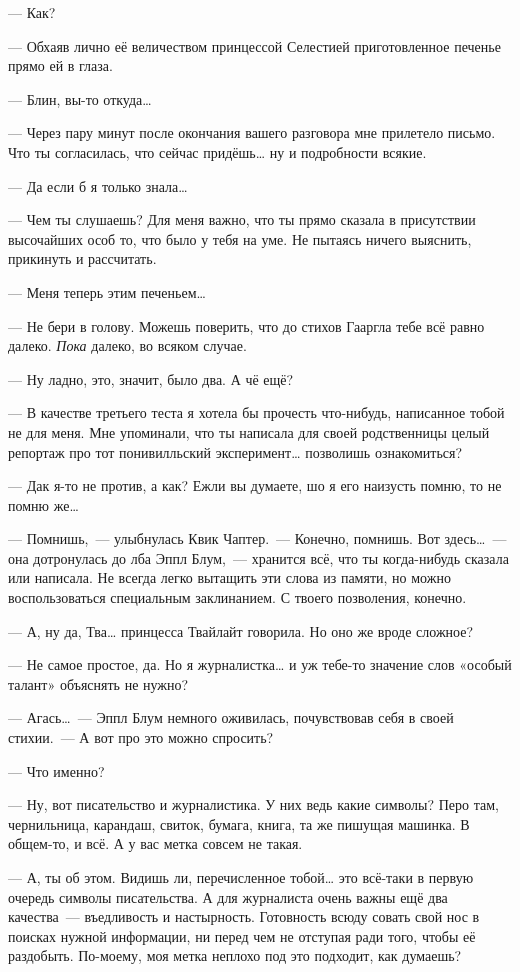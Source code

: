 \documentclass[fontsize=11pt,a5paper,titlepage=firstcover]{scrbook}
\begin{document}
--- Как?

--- Обхаяв лично её величеством принцессой Селестией приготовленное печенье прямо ей в глаза.

--- Блин, вы-то откуда{\ldots}

--- Через пару минут после окончания вашего разговора мне прилетело письмо. Что ты согласилась, что сейчас придёшь{\ldots} ну и подробности всякие.

--- Да если б я только знала{\ldots}

--- Чем ты слушаешь? Для меня важно, что ты прямо сказала в присутствии высочайших особ то, что было у тебя на уме. Не пытаясь ничего выяснить, прикинуть и рассчитать.

--- Меня теперь этим печеньем{\ldots}

--- Не бери в голову. Можешь поверить, что до стихов Гааргла тебе всё равно далеко. \emph{Пока} далеко, во всяком случае.

--- Ну ладно, это, значит, было два. А чё ещё?

--- В качестве третьего теста я хотела бы прочесть что-нибудь, написанное тобой не для меня. Мне упоминали, что ты написала для своей родственницы целый репортаж про тот понивилльский эксперимент{\ldots} позволишь ознакомиться?

--- Дак я-то не против, а как? Ежли вы думаете, шо я его наизусть помню, то не помню же{\ldots}

--- Помнишь,~--- улыбнулась Квик Чаптер.~--- Конечно, помнишь. Вот здесь{\ldots}~--- она дотронулась до лба Эппл Блум,~--- хранится всё, что ты когда-нибудь сказала или написала. Не всегда легко вытащить эти слова из памяти, но можно воспользоваться специальным заклинанием. С твоего позволения, конечно.

--- А, ну да, Тва{\ldots} принцесса Твайлайт говорила. Но оно же вроде сложное?

--- Не самое простое, да. Но я журналистка{\ldots} и уж тебе-то значение слов «особый талант» объяснять не нужно?

--- Агась{\ldots}~--- Эппл Блум немного оживилась, почувствовав себя в своей стихии.~--- А вот про это можно спросить?

--- Что именно?

--- Ну, вот писательство и журналистика. У них ведь какие символы? Перо там, чернильница, карандаш, свиток, бумага, книга, та же пишущая машинка. В общем-то, и всё. А у вас метка совсем не такая.

--- А, ты об этом. Видишь ли, перечисленное тобой{\ldots} это всё-таки в первую очередь символы писательства. А для журналиста очень важны ещё два качества~--- въедливость и настырность. Готовность всюду совать свой нос в поисках нужной информации, ни перед чем не отступая ради того, чтобы её раздобыть. По-моему, моя метка неплохо под это подходит, как думаешь?
\end{document}

